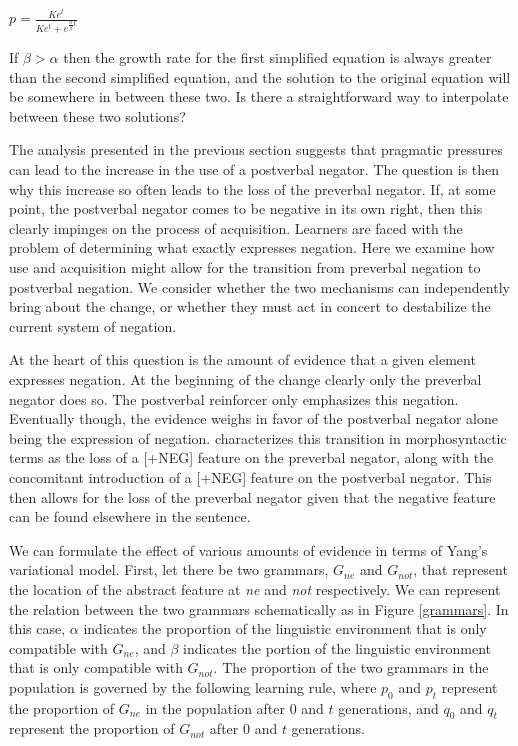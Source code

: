 $p = \frac{Ke^t}{Ke^t + e^{\frac{\alpha}{\beta}t}}$

If $\beta > \alpha$ then the growth rate for the first simplified equation is always greater than the second simplified equation, and the solution to the original equation will be somewhere in between these two. Is there a straightforward way to interpolate between these two solutions?


The analysis presented in the previous section suggests that pragmatic pressures can lead to the increase in the use of a postverbal negator. The question is then why this increase so often leads to the loss of the preverbal negator. If, at some point, the postverbal negator comes to be negative in its own right, then this clearly impinges on the process of acquisition. Learners are faced with the problem of determining what exactly expresses negation. Here we examine how use and acquisition might allow for the transition from preverbal negation to postverbal negation. We consider whether the two mechanisms can independently bring about the change, or whether they must act in concert to destabilize the current system of negation.

At the heart of this question is the amount of evidence that a given element expresses negation. At the beginning of the change clearly only the preverbal negator does so. The postverbal reinforcer only emphasizes this negation. Eventually though, the evidence weighs in favor of the postverbal negator alone being the expression of negation. \cite{wallage2008} characterizes this transition in morphosyntactic terms as the loss of a [+NEG] feature on the preverbal negator, along with the concomitant introduction of a [+NEG] feature on the postverbal negator. This then allows for the loss of the preverbal negator given that the negative feature can be found elsewhere in the sentence.

We can formulate the effect of various amounts of evidence in terms of Yang's \citeyearpar{yang:2002} variational model. First, let there be two grammars, $G_{ne}$ and $G_{not}$, that represent the location of the abstract feature at \emph{ne} and \emph{not} respectively. We can represent the relation between the two grammars schematically as in Figure \ref{grammars}. In this case, $\alpha$ indicates the proportion of the linguistic environment that is only compatible with $G_{ne}$, and $\beta$ indicates the portion of the linguistic environment that is only compatible with $G_{not}$. The proportion of the two grammars in the population is governed by the following learning rule, where $p_0$ and $p_t$ represent the proportion of $G_{ne}$ in the population after $0$ and $t$ generations, and $q_0$ and $q_t$ represent the proportion of $G_{not}$ after $0$ and $t$ generations.

